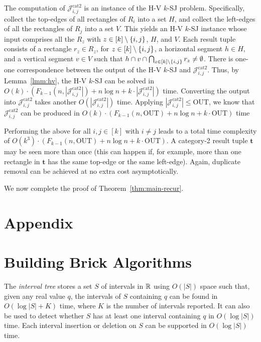 \documentclass[sigconf]{acmart}
\def\vgap{\vspace{0mm}}
\def\extraspacing{\vspace{1.5mm} \noindent}
\def\J{\mathcal{J}}
\def\catt{\mathrm{cat2}}
\def\out{\mathrm{OUT}}
\begin{document}
{{{The computation of $\J^\catt_{i,j}$ is an instance of the H-V $k$-SJ problem. Specifically, collect the top-edges of all rectangles of $R_i$ into a set $H$, and collect the left-edges of all the rectangles of $R_j$ into a set $V$. This yields an H-V $k$-SJ instance whose input comprises all the $R_z$ with $z \in [k] \setminus \{i,j\}$,  $H$, and $V$. Each result tuple consists of a rectangle $r_z \in R_z$, for $z \in [k] \setminus \{i,j\}$, a horizontal segment $h \in H$, and a vertical segment $v \in V$ such that $h \cap v \cap \bigcap_{z \in [k] \setminus \{i,j\}} r_z \ne \emptyset$. There is one-one correspondence between the output of the H-V $k$-SJ and $\J^\catt_{i,j}$. Thus, by Lemma~\ref{lmm:hv}, the H-V $k$-SJ can be solved in $O(k) \cdot (F_{k-1}(n, |\J^\catt_{i,j}|) + n \log n + k \cdot |\J^\catt_{i,j}|)$ time. Converting the output into $\J^\catt_{i,j}$ takes another $O(|\J^\catt_{i,j}|)$ time. Applying $|\J^\catt_{i,j}| \le \out$, we know that $\J^\catt_{i,j}$ can be produced in $O(k) \cdot (F_{k-1}(n, \out) + n \log n + k \cdot \out)$ time

\vgap 

Performing the above for all $i, j \in [k]$ with $i \ne j$ leads to a total time complexity of $O(k^3) \cdot (F_{k-1}(n, \out) + n \log n + k \cdot \out)$. A category-2 result tuple $\bm{t}$ may be seen more than once (this can happen if, for example, more than one rectangle in $\bm{t}$ has the same top-edge or the same left-edge). Again, duplicate removal can be achieved at no extra cost asymptotically.

\vgap 

We now complete the proof of Theorem~\ref{thm:main-recur}.




\balance

\appendix 

\def\vgap{\vspace{1mm}}

\section*{Appendix}

\section{Building Brick Algorithms} \label{app:bricks}

\extraspacing {\bf Algorithm for Problem $\bm{\mathscr{A}}$.} The {\em interval tree} \cite{bcko08} stores a set $S$ of intervals in $\mathbb{R}$ using $O(|S|)$ space such that, given any real value $q$, the intervals of $S$ containing $q$ can be found in $O(\log |S| + K)$ time, where $K$ is the number of intervals reported. It can also be used to detect whether $S$ has at least one interval containing $q$ in $O(\log |S|)$ time. Each interval insertion or deletion on $S$ can be supported in $O(\log |S|)$ time.

}}}
\end{document}
